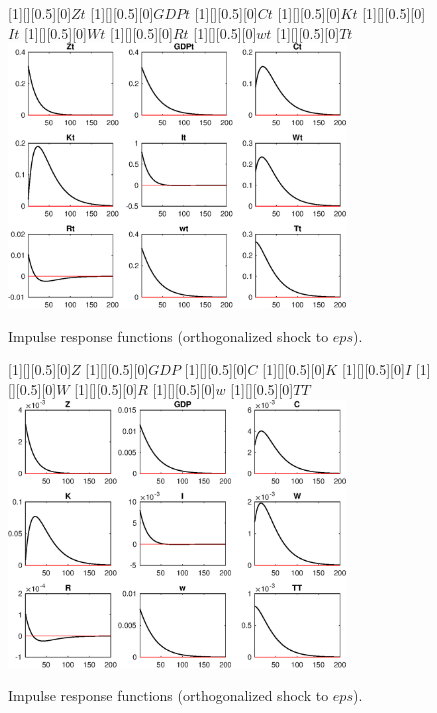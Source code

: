  
\begin{figure}[H]
[1][][0.5][0]{$Zt$}
[1][][0.5][0]{$GDPt$}
[1][][0.5][0]{$Ct$}
[1][][0.5][0]{$Kt$}
[1][][0.5][0]{$It$}
[1][][0.5][0]{$Wt$}
[1][][0.5][0]{$Rt$}
[1][][0.5][0]{$wt$}
[1][][0.5][0]{$Tt$}
\centering 
\includegraphics[width=0.80\textwidth]{DyRA/graphs/DyRA_IRF_eps1}
\caption{Impulse response functions (orthogonalized shock to $eps$).}\label{Fig:IRF:eps:1}
\end{figure}
 
\begin{figure}[H]
[1][][0.5][0]{$Z$}
[1][][0.5][0]{$GDP$}
[1][][0.5][0]{$C$}
[1][][0.5][0]{$K$}
[1][][0.5][0]{$I$}
[1][][0.5][0]{$W$}
[1][][0.5][0]{$R$}
[1][][0.5][0]{$w$}
[1][][0.5][0]{$TT$}
\centering 
\includegraphics[width=0.80\textwidth]{DyRA/graphs/DyRA_IRF_eps2}
\caption{Impulse response functions (orthogonalized shock to $eps$).}\label{Fig:IRF:eps:2}
\end{figure}
 
 

